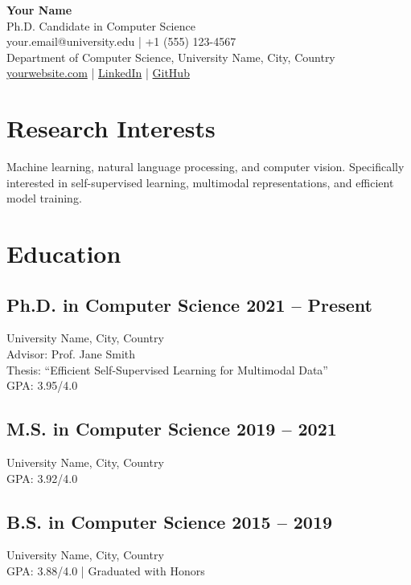 \documentclass[11pt,a4paper]{article}
\begin{document}
\begin{center}
  {\LARGE \textbf{Your Name}}\\[4pt]
  {\large Ph.D. Candidate in Computer Science}\\[4pt]
  \small
  your.email@university.edu | +1 (555) 123-4567\\
  Department of Computer Science, University Name, City, Country\\
  \href{https://yourwebsite.com}{yourwebsite.com} |
  \href{https://linkedin.com/in/yourprofile}{LinkedIn} |
  \href{https://github.com/yourusername}{GitHub}
\end{center}

\vspace{8pt}

\section{Research Interests}
Machine learning, natural language processing, and computer vision. Specifically interested in
self-supervised learning, multimodal representations, and efficient model training.

\section{Education}

\subsection{Ph.D. in Computer Science \hfill 2021 -- Present}
University Name, City, Country\\
Advisor: Prof. Jane Smith\\
Thesis: ``Efficient Self-Supervised Learning for Multimodal Data''\\
GPA: 3.95/4.0

\subsection{M.S. in Computer Science \hfill 2019 -- 2021}
University Name, City, Country\\
GPA: 3.92/4.0

\subsection{B.S. in Computer Science \hfill 2015 -- 2019}
University Name, City, Country\\
GPA: 3.88/4.0 | Graduated with Honors
\end{document}
